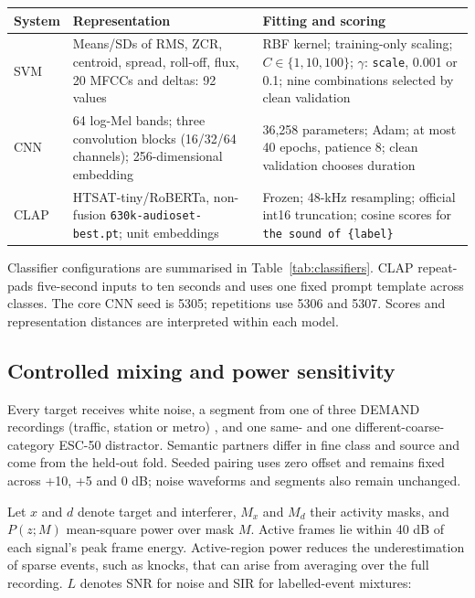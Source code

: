 \documentclass[a4paper,10pt]{article}
\begin{document}
\begin{center}\begin{minipage}{\linewidth}\small\centering
{}\label{tab:classifiers}

\begin{tabularx}{\textwidth}{@{}lXX@{}}\toprule
System & Representation & Fitting and scoring\\\midrule
SVM & Means/SDs of RMS, ZCR, centroid, spread, roll-off, flux, 20 MFCCs and deltas: 92 values & RBF kernel; training-only scaling; $C\in\{1,10,100\}$; $\gamma$: \texttt{scale}, 0.001 or 0.1; nine combinations selected by clean validation\\
CNN & 64 log-Mel bands; three convolution blocks (16/32/64 channels); 256-dimensional embedding & 36,258 parameters; Adam; at most 40 epochs, patience 8; clean validation chooses duration\\
CLAP & HTSAT-tiny/RoBERTa, non-fusion \texttt{630k-audioset-best.pt}; unit embeddings & Frozen; 48-kHz resampling; official int16 truncation; cosine scores for \texttt{the sound of \{label\}}\\\bottomrule
\end{tabularx}
\end{minipage}\end{center}

Classifier configurations are summarised in Table~\ref{tab:classifiers}. CLAP repeat-pads five-second inputs to ten seconds and uses one fixed prompt template across classes. The core CNN seed is 5305; repetitions use 5306 and 5307. Scores and representation distances are interpreted within each model.

\subsection{Controlled mixing and power sensitivity}

Every target receives white noise, a segment from one of three DEMAND recordings (traffic, station or metro) \cite{demand}, and one same- and one different-coarse-category ESC-50 distractor. Semantic partners differ in fine class and source and come from the held-out fold. Seeded pairing uses zero offset and remains fixed across +10, +5 and 0 dB; noise waveforms and segments also remain unchanged.

Let $x$ and $d$ denote target and interferer, $M_x$ and $M_d$ their activity masks, and $P(z;M)$ mean-square power over mask $M$. Active frames lie within 40 dB of each signal's peak frame energy. Active-region power reduces the underestimation of sparse events, such as knocks, that can arise from averaging over the full recording. $L$ denotes SNR for noise and SIR for labelled-event mixtures:
\end{document}
